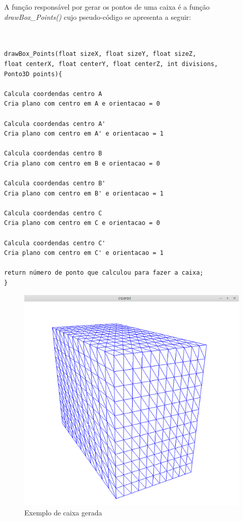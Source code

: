 \newpage


A função responsável por gerar os pontos de uma caixa é a função \textit{drawBox\_Points()} cujo pseudo-código se apresenta a seguir:

\begin{Verbatim}


drawBox_Points(float sizeX, float sizeY, float sizeZ, 
float centerX, float centerY, float centerZ, int divisions, 
Ponto3D points){

Calcula coordendas centro A
Cria plano com centro em A e orientacao = 0

Calcula coordendas centro A'
Cria plano com centro em A' e orientacao = 1

Calcula coordendas centro B
Cria plano com centro em B e orientacao = 0

Calcula coordendas centro B'
Cria plano com centro em B' e orientacao = 1

Calcula coordendas centro C
Cria plano com centro em C e orientacao = 0

Calcula coordendas centro C'
Cria plano com centro em C' e orientacao = 1

return número de ponto que calculou para fazer a caixa;
}

\end{Verbatim}

\begin{figure}[<+htpb+>]
	\centering
	\includegraphics[scale=0.5]{imagens/p3_caixa_10.png}
	\caption{Exemplo de caixa gerada}
	\label{p1:fig:p3_caixa_6_3_4}
\end{figure}



